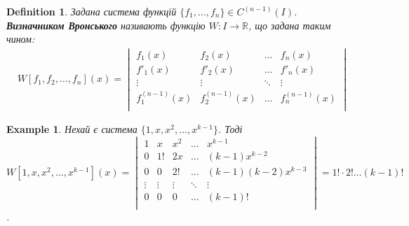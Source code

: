 \documentclass[a4paper, 10pt]{article}
\theoremstyle{theoremdd}
\theoremstyle{theoremdd}
\newtheorem{definition}[theorem]{Definition}
\theoremstyle{theoremdd}
\theoremstyle{theoremdd}
\newtheorem{example}[theorem]{Example}
\theoremstyle{theoremdd}
\theoremstyle{theoremdd}
\theoremstyle{theoremdd}
\theoremstyle{theoremdd}
\begin{document}
	\begin{definition}
 Задана система функцій $\{f_1, \dots, f_n\} \in C^{(n-1)}(I)$.\\
	\textbf{Визначником Вронського} називають функцію $W \colon I \to \mathbb{R}$, що задана таким чином:
	\begin{align*}
W[f_1,f_2,\dots,f_n](x) = 
\begin{vmatrix} 
	f_1(x) &  f_2(x) & \dots & f_n(x) \\ 
	f'_1(x) &  f'_2(x) & \dots & f'_n(x) \\
	\vdots &  \vdots & \ddots & \vdots \\
	f^{(n-1)}_1(x) &  f^{(n-1)}_2(x) & \dots & f^{(n-1)}_n(x) \\ 
\end{vmatrix}
	\end{align*}
	\end{definition}
	
	\begin{example}
 Нехай є система $\{1,x,x^2,\dots,x^{k-1}\}$. Тоді\\
	$\displaystyle W[1,x,x^2,\dots,x^{k-1}](x) = 
	\begin{vmatrix} 
	1 &  x & x^2 & \dots & x^{k-1} \\ 
	0 &  1! & 2x & \dots & (k-1)x^{k-2} \\ 
	0 &  0 & 2! & \dots & (k-1)(k-2)x^{k-3} \\
	\vdots & \vdots & \vdots & \ddots & \vdots \\
	0 &  0 & 0 & \dots & (k-1)! \\
\end{vmatrix} = 1! \cdot 2! \dots (k-1)!$.
	\end{example}
	
\end{document}
